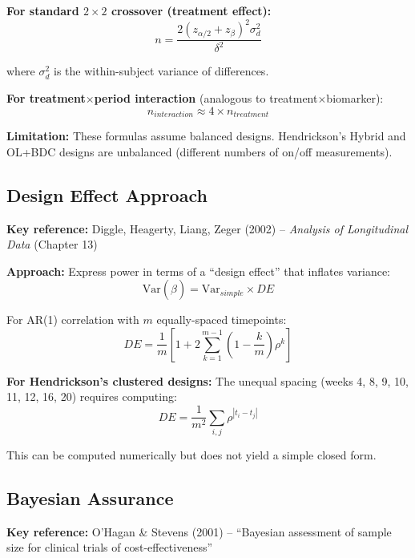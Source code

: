 \documentclass[11pt]{article}
\theoremstyle{definition}
\begin{document}
\textbf{For standard $2 \times 2$ crossover (treatment effect):}
\begin{equation}
n = \frac{2(z_{\alpha/2} + z_{\beta})^2 \sigma_d^2}{\delta^2}
\end{equation}

where $\sigma_d^2$ is the within-subject variance of differences.

\textbf{For treatment$\times$period interaction} (analogous to
treatment$\times$biomarker):
\begin{equation}
n_{interaction} \approx 4 \times n_{treatment}
\end{equation}

\textbf{Limitation:} These formulas assume balanced designs. Hendrickson's Hybrid
and OL+BDC designs are unbalanced (different numbers of on/off measurements).

\subsection{Design Effect Approach}

\textbf{Key reference:} Diggle, Heagerty, Liang, Zeger (2002) --
\textit{Analysis of Longitudinal Data} (Chapter 13)

\textbf{Approach:} Express power in terms of a ``design effect'' that inflates variance:
\begin{equation}
\text{Var}(\hat{\beta}) = \text{Var}_{simple} \times DE
\end{equation}

For AR(1) correlation with $m$ equally-spaced timepoints:
\begin{equation}
DE = \frac{1}{m} \left[1 + 2\sum_{k=1}^{m-1}\left(1 - \frac{k}{m}\right)\rho^k\right]
\end{equation}

\textbf{For Hendrickson's clustered designs:} The unequal spacing
(weeks 4, 8, 9, 10, 11, 12, 16, 20) requires computing:
\begin{equation}
DE = \frac{1}{m^2} \sum_{i,j} \rho^{|t_i - t_j|}
\end{equation}

This can be computed numerically but does not yield a simple closed form.

\subsection{Bayesian Assurance}

\textbf{Key reference:} O'Hagan \& Stevens (2001) -- ``Bayesian assessment of
sample size for clinical trials of cost-effectiveness''
\end{document}
